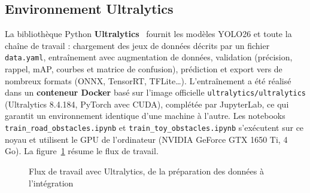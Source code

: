 \subsection{Environnement Ultralytics}
La bibliothèque Python \textbf{Ultralytics}~\cite{ultralytics26} fournit les modèles YOLO26 et toute la chaîne de
travail : chargement des jeux de données décrits par un fichier \texttt{data.yaml}, entraînement avec augmentation de
données, validation (précision, rappel, mAP, courbes et matrice de confusion), prédiction et export vers de
nombreux formats (ONNX, TensorRT, TFLite…). L'entraînement a été réalisé dans un \textbf{conteneur Docker} basé sur
l'image officielle \texttt{ultralytics/ultralytics} (Ultralytics 8.4.184, PyTorch avec CUDA), complétée par
JupyterLab, ce qui garantit un environnement identique d'une machine à l'autre. Les notebooks
\texttt{train\_road\_obstacles.ipynb} et \texttt{train\_toy\_obstacles.ipynb} s'exécutent sur ce noyau et utilisent le
GPU de l'ordinateur (NVIDIA GeForce GTX 1650 Ti, 4 Go). La figure~\ref{fig:workflow} résume le flux de travail.

\begin{figure}[H]
\centering
{}
\caption{Flux de travail avec Ultralytics, de la préparation des données à l'intégration}
\label{fig:workflow}
\end{figure}

